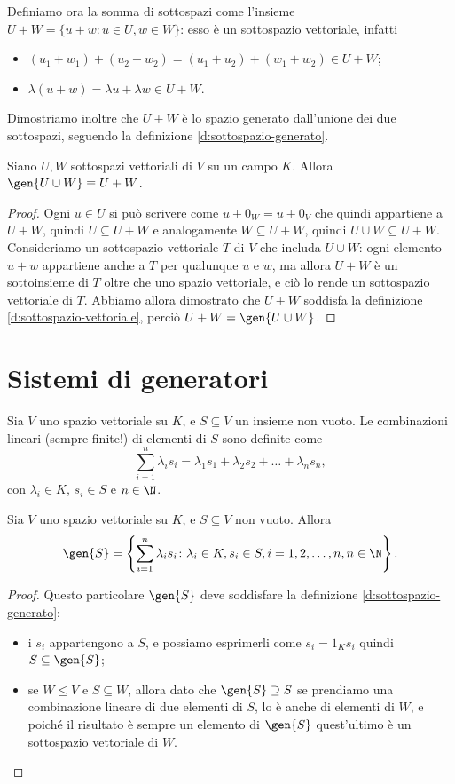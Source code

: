 Definiamo ora la somma di sottospazi come l'insieme $U+W=\{  u+  w\colon  u\in U,   w\in W\}$: esso è un sottospazio vettoriale, infatti
\begin{itemize}
	\item $(  u_1+  w_1)+(  u_2+  w_2)=(  u_1+  u_2)+(  w_1+  w_2)\in U+W$;
	\item $\lambda(  u+  w)=\lambda  u+\lambda  w\in U+W$.
\end{itemize}
Dimostriamo inoltre che $U+W$ è lo spazio generato dall'unione dei due sottospazi, seguendo la definizione \ref{d:sottospazio-generato}.
\begin{teorema}
	Siano $U,W$ sottospazi vettoriali di $V$ su un campo $K$. Allora $\gen{U\cup W}\equiv U+W$.
\end{teorema}
\begin{proof}
	Ogni $  u\in U$ si può scrivere come $  u+0_W=  u+  0_V$ che quindi appartiene a $U+W$, quindi $U\subseteq U+W$ e analogamente $W\subseteq U+W$, quindi $U\cup W\subseteq U+W$.
	Consideriamo un sottospazio vettoriale $T$ di $V$ che includa $U\cup W$: ogni elemento $  u+  w$ appartiene anche a $T$ per qualunque $  u$ e $  w$, ma allora $U+W$ è un sottoinsieme di $T$ oltre che uno spazio vettoriale, e ciò lo rende un sottospazio vettoriale di $T$.
	Abbiamo allora dimostrato che $U+W$ soddisfa la definizione \ref{d:sottospazio-vettoriale}, perciò $U+W=\gen{U\cup W}$.
\end{proof}

\section{Sistemi di generatori} \label{sec:sistemi-generatori}
Sia $V$ uno spazio vettoriale su $K$, e $S\subseteq V$ un insieme non vuoto.
Le combinazioni lineari (sempre finite!) di elementi di $S$ sono definite come
\begin{equation*}
	\sum_{i=1}^n\lambda_i  s_i=\lambda_1  s_1+\lambda_2  s_2+\dots+\lambda_n  s_n,
\end{equation*}
con $\lambda_i\in K$, $  s_i\in S$ e $n\in\N$.

\begin{teorema}
	Sia $V$ uno spazio vettoriale su $K$, e $S\subseteq V$ non vuoto. Allora
	\begin{equation*}
		\gen{S}=\left\{\sum_{i=1}^n\lambda_i  s_i\colon \lambda_i\in K,   s_i\in S, i=1,2,\dots,n, n\in\N\right\}.
	\end{equation*}
\end{teorema}
\begin{proof}
	Questo particolare $\gen{S}$ deve soddisfare la definizione \ref{d:sottospazio-generato}:
	\begin{itemize}
		\item i $  s_i$ appartengono a $S$, e possiamo esprimerli come $  s_i=1_K  s_i$ quindi $S\subseteq\gen{S}$;
		\item se $W\leq V$ e $S\subseteq W$, allora dato che $\gen{S}\supseteq S$ se prendiamo una combinazione lineare di due elementi di $S$, lo è anche di elementi di $W$, e poiché il risultato è sempre un elemento di $\gen{S}$ quest'ultimo è un sottospazio vettoriale di $W$.
	\end{itemize}
\end{proof}

